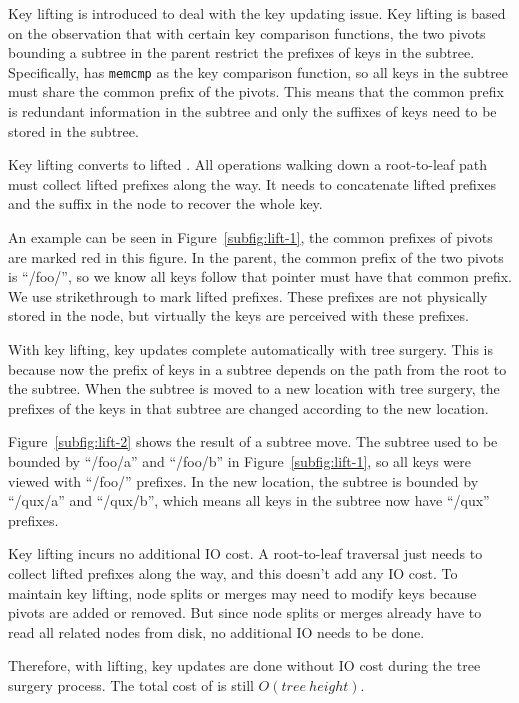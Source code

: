 Key lifting is introduced to deal with the key updating issue.
Key lifting is based on the observation that with certain key comparison
functions, the two pivots bounding a subtree in the parent restrict the prefixes
of keys in the subtree.
Specifically, \betrfs has \texttt{memcmp} as the key comparison function, so all
keys in the subtree must share the common prefix of the pivots.
This means that the common prefix is redundant information in the subtree and
only the suffixes of keys need to be stored in the subtree.

Key lifting converts \bets to lifted \bets.
All operations walking down a root-to-leaf path must collect lifted prefixes
along the way.
It needs to concatenate lifted prefixes and the suffix in the node to recover
the whole key.

An example can be seen in Figure~\ref{subfig:lift-1}, the common prefixes of
pivots are marked red in this figure.
In the parent, the common prefix of the two pivots is ``/foo/'', so we know all
keys follow that pointer must have that common prefix.
We use strikethrough to mark lifted prefixes.
These prefixes are not physically stored in the node, but virtually the keys are
perceived with these prefixes.

With key lifting, key updates complete automatically with tree surgery.
This is because now the prefix of keys in a subtree depends on the path from
the root to the subtree.
When the subtree is moved to a new location with tree surgery, the prefixes
of the keys in that subtree are changed according to the new location.

Figure~\ref{subfig:lift-2} shows the result of a subtree move.
The subtree used to be bounded by ``/foo/a'' and ``/foo/b'' in
Figure~\ref{subfig:lift-1}, so all keys were viewed with ``/foo/'' prefixes.
In the new location, the subtree is bounded by ``/qux/a'' and ``/qux/b'',
which means all keys in the subtree now have ``/qux'' prefixes.

Key lifting incurs no additional IO cost.
A root-to-leaf traversal just needs to collect lifted prefixes along the way,
and this doesn't add any IO cost.
To maintain key lifting, node splits or merges may need to modify keys because
pivots are added or removed.
But since node splits or merges already have to read all related nodes from
disk, no additional IO needs to be done.

Therefore, with lifting, key updates are done without IO cost during the tree
surgery process.
The total cost of \rr is still $O(tree\ height)$.

